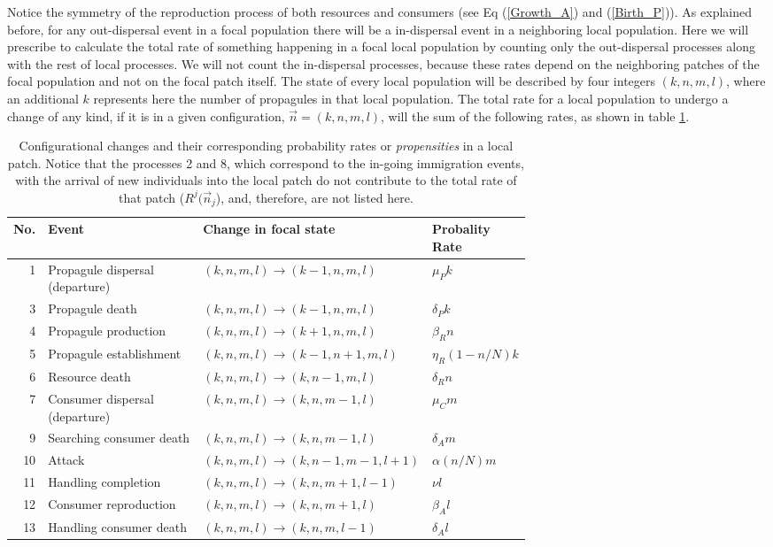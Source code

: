 Notice the symmetry of the reproduction process of both resources and consumers (see Eq (\ref{Growth_A}) and (\ref{Birth_P})). As explained before, for any out-dispersal event in a focal population there will be a in-dispersal event in a neighboring local population. Here we will prescribe to calculate the total rate of something happening in a focal local population by counting only the out-dispersal processes along with the rest of local processes. We will not count the in-dispersal processes, because these rates depend on the neighboring patches of the focal population and not on the focal patch itself. The state of every local population will be described by four integers $(k,n,m,l)$, where an additional $k$ represents here the number of propagules in that local population. The total rate for a local population to undergo a change of any kind, if it is in a given configuration, $\vec{n}=(k,n,m,l)$, will the sum of the following rates, as shown in table \ref{tab:Configuration-change rates}. 
\begin{table}[h]
\centering
\small
\renewcommand{\arraystretch}{1.18}
\begin{tabular}{@{}r p{0.33\linewidth} p{0.35\linewidth} l@{}}
\hline
No. & Event & Change in focal state & Probality Rate \\
\hline
1 & Propagule dispersal (departure) & $(k,n,m,l)\to(k-1,n,m,l)$ & $\mu_P k$ \\
3 & Propagule death & $(k,n,m,l)\to(k-1,n,m,l)$ & $\delta_P k$ \\
4 & Propagule production & $(k,n,m,l)\to(k+1,n,m,l)$ & $\beta_R n$ \\
5 & Propagule establishment & $(k,n,m,l)\to(k-1,n+1,m,l)$ & $\eta_R (1-n/N)k$ \\
6 & Resource death & $(k,n,m,l)\to(k,n-1,m,l)$ & $\delta_R n$ \\
7 & Consumer dispersal (departure) & $(k,n,m,l)\to(k,n,m-1,l)$ & $\mu_C m$ \\
9 & Searching consumer death & $(k,n,m,l)\to(k,n,m-1,l)$ & $\delta_A m$ \\
10 & Attack & $(k,n,m,l)\to(k,n-1,m-1,l+1)$ & $\alpha(n/N)m$ \\
11 & Handling completion & $(k,n,m,l)\to(k,n,m+1,l-1)$ & $\nu l$ \\
12 & Consumer reproduction & $(k,n,m,l)\to(k,n,m+1,l)$ & $\beta_A l$ \\
13 & Handling consumer death & $(k,n,m,l)\to(k,n,m,l-1)$ & $\delta_A l$ \\
\hline
\end{tabular}
\caption{Configurational changes and their corresponding probability rates or {\em propensities} in a local patch. Notice that the processes 2 and 8, which correspond to the in-going immigration events, with the arrival of new individuals into the local patch do not contribute to the total rate of that patch ($R^j(\vec{n}_j$), and, therefore, are not listed here.}
\label{tab:Configuration-change rates}
\end{table}
